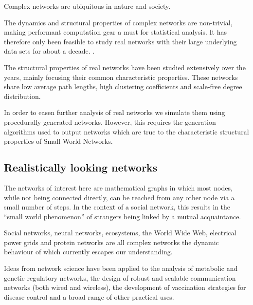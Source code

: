 \documentclass[a4paper,11pt,titlepage]{article}
\begin{document}
Complex networks are ubiquitous in nature and society.

The dynamics and structural properties of complex networks are non-trivial,
making performant computation gear a must for statistical analysis.
It has therefore only been feasible to study real networks with their
large underlying data sets for about a decade.
\cite{oconn11}.

The structural properties of real networks have been studied extensively
over the years, mainly focusing their common characteristic properties.
These networks share low average path lengths, high clustering
coefficients and scale-free degree distribution.

In order to easen further analysis of real networks we simulate them
using procedurally generated networks. However, this requires the
generation algorithms used to output networks which are true to the
characteristic structural properties of Small World Networks.

\subsection{Realistically looking networks}


The networks of interest here are mathematical graphs in which most nodes,
while not being connected directly, can be reached from any other node via a
small number of steps. In the context of a social network, this results in the
``small world phenomenon'' \cite{smphen} of strangers
being linked by a mutual acquaintance.


Social networks, neural networks, ecosystems, the World Wide Web, electrical
power grids and protein networks are all complex networks the dynamic
behaviour of which currently escapes our understanding.


Ideas from network science have been applied to the analysis of metabolic and
genetic regulatory networks, the design of robust and scalable communication
networks (both wired and wireless), the development of vaccination strategies
for disease control and a broad range of other practical
uses. \cite{complexNets}
\end{document}

